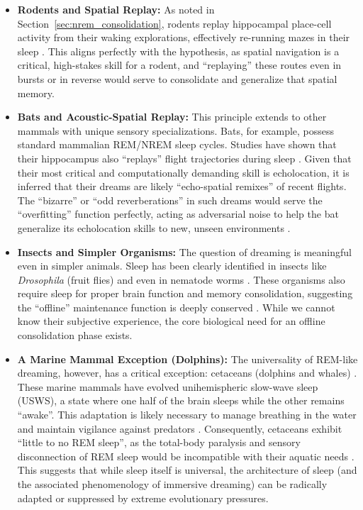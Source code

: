 \begin{itemize}
    \item \textbf{Rodents and Spatial Replay:} As noted in Section~\ref{sec:nrem_consolidation}, rodents replay hippocampal place-cell activity from their waking explorations, effectively re-running mazes in their sleep \citep{wilson1994reactivation}. This aligns perfectly with the hypothesis, as spatial navigation is a critical, high-stakes skill for a rodent, and ``replaying'' these routes even in bursts or in reverse would serve to consolidate and generalize that spatial memory.
    \item \textbf{Bats and Acoustic-Spatial Replay:} This principle extends to other mammals with unique sensory specializations. Bats, for example, possess standard mammalian REM/NREM sleep cycles. Studies have shown that their hippocampus also ``replays'' flight trajectories during sleep \citep{omer2025batreplay}. Given that their most critical and computationally demanding skill is echolocation, it is inferred that their dreams are likely ``echo-spatial remixes'' of recent flights. The ``bizarre'' or ``odd reverberations'' in such dreams would serve the ``overfitting'' function perfectly, acting as adversarial noise to help the bat generalize its echolocation skills to new, unseen environments \citep{suga2003}.
    \item \textbf{Insects and Simpler Organisms:} The question of dreaming is meaningful even in simpler animals. Sleep has been clearly identified in insects like \textit{Drosophila} (fruit flies) \citep{tian2023drosophila} and even in nematode worms \citep{lesku2016evolutionary}. These organisms also require sleep for proper brain function and memory consolidation, suggesting the ``offline'' maintenance function is deeply conserved \citep{tian2023drosophila}. While we cannot know their subjective experience, the core biological need for an offline consolidation phase exists.
    \item \textbf{A Marine Mammal Exception (Dolphins):} The universality of REM-like dreaming, however, has a critical exception: cetaceans (dolphins and whales) \citep{lyamin2021cetacean}. These marine mammals have evolved unihemispheric slow-wave sleep (USWS), a state where one half of the brain sleeps while the other remains ``awake''. This adaptation is likely necessary to manage breathing in the water and maintain vigilance against predators \citep{ridgway2002, rattenborg2000}. Consequently, cetaceans exhibit ``little to no REM sleep'', as the total-body paralysis and sensory disconnection of REM sleep would be incompatible with their aquatic needs \citep{lyamin2021cetacean}. This suggests that while sleep itself is universal, the architecture of sleep (and the associated phenomenology of immersive dreaming) can be radically adapted or suppressed by extreme evolutionary pressures.
\end{itemize}

